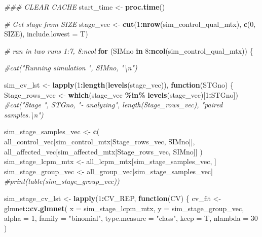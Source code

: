 \documentclass[
]{book}
\newenvironment{Shaded}{\begin{snugshade}}{\end{snugshade}}
\newcommand{\CommentTok}[1]{\textcolor[rgb]{0.56,0.35,0.01}{\textit{#1}}}
\newcommand{\ControlFlowTok}[1]{\textcolor[rgb]{0.13,0.29,0.53}{\textbf{#1}}}
\newcommand{\DataTypeTok}[1]{\textcolor[rgb]{0.13,0.29,0.53}{#1}}
\newcommand{\DecValTok}[1]{\textcolor[rgb]{0.00,0.00,0.81}{#1}}
\newcommand{\KeywordTok}[1]{\textcolor[rgb]{0.13,0.29,0.53}{\textbf{#1}}}
\newcommand{\NormalTok}[1]{#1}
\newcommand{\OperatorTok}[1]{\textcolor[rgb]{0.81,0.36,0.00}{\textbf{#1}}}
\newcommand{\StringTok}[1]{\textcolor[rgb]{0.31,0.60,0.02}{#1}}
\begin{document}
\begin{Shaded}
\begin{Highlighting}[]
\CommentTok{\#\#\# CLEAR CACHE}
\NormalTok{start\_time <{-}}\StringTok{ }\KeywordTok{proc.time}\NormalTok{()}

\CommentTok{\# Get stage from SIZE}
\NormalTok{stage\_vec <{-}}\StringTok{ }\KeywordTok{cut}\NormalTok{(}\DecValTok{1}\OperatorTok{:}\KeywordTok{nrow}\NormalTok{(sim\_control\_qual\_mtx), }\KeywordTok{c}\NormalTok{(}\DecValTok{0}\NormalTok{, SIZE), }\DataTypeTok{include.lowest =}\NormalTok{ T)}

\CommentTok{\# ran in two runs 1:7, 8:ncol}
\ControlFlowTok{for}\NormalTok{ (SIMno }\ControlFlowTok{in} \DecValTok{8}\OperatorTok{:}\KeywordTok{ncol}\NormalTok{(sim\_control\_qual\_mtx)) \{}

  \CommentTok{\#cat("Running simulation ", SIMno, "\textbackslash{}n")}

\NormalTok{  sim\_cv\_lst <{-}}\StringTok{ }\KeywordTok{lapply}\NormalTok{(}\DecValTok{1}\OperatorTok{:}\KeywordTok{length}\NormalTok{(}\KeywordTok{levels}\NormalTok{(stage\_vec)), }\ControlFlowTok{function}\NormalTok{(STGno) \{}
\NormalTok{    Stage\_rows\_vec <{-}}\StringTok{ }\KeywordTok{which}\NormalTok{(stage\_vec }\OperatorTok{\%in\%}\StringTok{ }\KeywordTok{levels}\NormalTok{(stage\_vec)[}\DecValTok{1}\OperatorTok{:}\NormalTok{STGno])}
    \CommentTok{\#cat("Stage ", STGno, "{-} analyzing", length(Stage\_rows\_vec), "paired samples.\textbackslash{}n")}

\NormalTok{    sim\_stage\_samples\_vec <{-}}\StringTok{ }\KeywordTok{c}\NormalTok{(}
\NormalTok{      all\_control\_vec[sim\_control\_mtx[Stage\_rows\_vec, SIMno]],}
\NormalTok{      all\_affected\_vec[sim\_affected\_mtx[Stage\_rows\_vec, SIMno]]}
\NormalTok{    )}
\NormalTok{    sim\_stage\_lcpm\_mtx <{-}}\StringTok{ }\NormalTok{all\_lcpm\_mtx[sim\_stage\_samples\_vec, ]}
\NormalTok{    sim\_stage\_group\_vec <{-}}\StringTok{ }\NormalTok{all\_group\_vec[sim\_stage\_samples\_vec]}
    \CommentTok{\#print(table(sim\_stage\_group\_vec))}

\NormalTok{    sim\_stage\_cv\_lst <{-}}\StringTok{ }\KeywordTok{lapply}\NormalTok{(}\DecValTok{1}\OperatorTok{:}\NormalTok{CV\_REP, }\ControlFlowTok{function}\NormalTok{(CV) \{}
\NormalTok{      cv\_fit <{-}}\StringTok{ }\NormalTok{glmnet}\OperatorTok{::}\KeywordTok{cv.glmnet}\NormalTok{(}
        \DataTypeTok{x =}\NormalTok{ sim\_stage\_lcpm\_mtx,}
        \DataTypeTok{y =}\NormalTok{ sim\_stage\_group\_vec,}
        \DataTypeTok{alpha =} \DecValTok{1}\NormalTok{,}
        \DataTypeTok{family =} \StringTok{"binomial"}\NormalTok{,}
        \DataTypeTok{type.measure =} \StringTok{"class"}\NormalTok{,}
        \DataTypeTok{keep =}\NormalTok{ T,}
        \DataTypeTok{nlambda =} \DecValTok{30}
\NormalTok{      )}


\end{Highlighting}
\end{Shaded}
\end{document}

